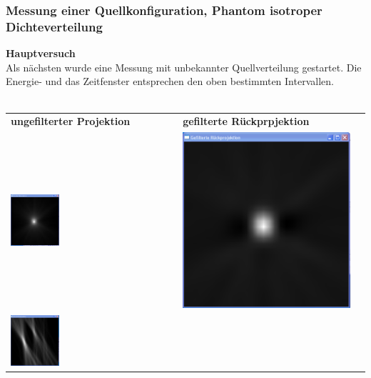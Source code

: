         \subsubsection{Messung einer Quellkonfiguration, Phantom isotroper Dichteverteilung}
          \textbf{Hauptversuch}\\
          Als nächsten wurde eine Messung mit unbekannter Quellverteilung gestartet. Die Energie- und das Zeitfenster entsprechen den oben bestimmten Intervallen.\\ \ \\
          \minipanf  
            \begin{center}
            \begin{tabular}{p{7cm}p{7cm}c}
                \textbf{ungefilterter Projektion} & \textbf{gefilterte Rückprpjektion}\\
                \includegraphics[width=0.3\textwidth, height=0.2\textheight]{pic/Einzelfenster_Bilder/unbekannte_Quelle/unbek1_einf_prj.png}
                & 
                \includegraphics[width=.3\textwidth, height=0.2\textheight]{pic/Einzelfenster_Bilder/unbekannte_Quelle/unbek1gef_prj.png}\\
                \includegraphics[width=0.3\textwidth, height=0.2\textheight]{pic/Einzelfenster_Bilder/unbekannte_Quelle/unbek2einf_prj.png}

\end{tabular}
\end{center}

